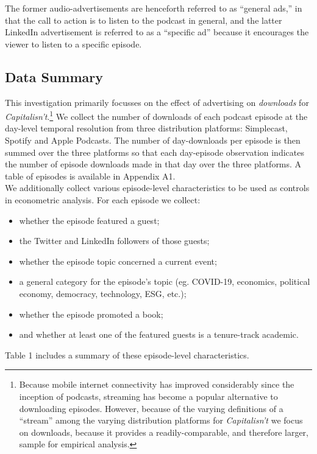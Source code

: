 \documentclass[11pt, letterpaper, twoside]{article}
\begin{document}
The former audio-advertisements are henceforth referred to as ``general ads,'' in that the call to action is to listen to the podcast in general, and the latter LinkedIn advertisement is referred to as a ``specific ad'' because it encourages the viewer to listen to a specific episode.

\subsection{Data Summary}
This investigation primarily focusses on the effect of advertising on \textit{downloads} for \textit{Capitalisn't}.\footnote{Because mobile internet connectivity has improved considerably since the inception of podcasts, streaming has become a popular alternative to downloading episodes. However, because of the varying definitions of a ``stream'' among the varying distribution platforms for \textit{Capitalisn't} we focus on downloads, because it provides a readily-comparable, and therefore larger, sample for empirical analysis.} We collect the number of downloads of each podcast episode at the day-level temporal resolution from three distribution platforms: Simplecast, Spotify and Apple Podcasts. The number of day-downloads per episode is then summed over the three platforms so that each day-episode observation indicates the number of episode downloads made in that day over the three platforms. A table of episodes is available in Appendix A1.\\

We additionally collect various episode-level characteristics to be used as controls in econometric analysis. For each episode we collect:
\begin{itemize}
    \itemsep 0em
    \item whether the episode featured a guest;
    \item the Twitter and LinkedIn followers of those guests;
    \item whether the episode topic concerned a current event;
    \item a general category for the episode's topic (eg. COVID-19, economics, political economy, democracy, technology, ESG, etc.);
    \item whether the episode promoted a book;
    \item and whether at least one of the featured guests is a tenure-track academic. 
\end{itemize}
Table 1 includes a summary of these episode-level characteristics.
\end{document}
